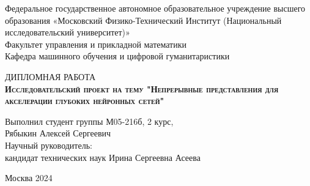 \begin{titlepage}
\newpage

{
\begin{center}
Федеральное государственное автономное образовательное учреждение высшего образования «Московский Физико-Технический Институт (Национальный исследовательский университет)»
\\
\bigskip
Факультет управления и прикладной математики \\
Кафедра машинного обучения и цифровой гуманитаристики \\
\end{center}
}

\vspace{8em}

\begin{center}
{\Large ДИПЛОМНАЯ РАБОТА}\\
\textsc{\textbf{
Исследовательский проект на тему
\linebreak
"Непрерывные представления для акселерации глубоких нейронных сетей"}}

\end{center}

\vspace{2em}

{
\hfill\parbox{16cm}{
\hspace*{5cm}\hspace*{-5cm}Выполнил студент группы М05-216б, 2 курс,\\
 Рябыкин Алексей Сергеевич\\
 
\hspace*{5cm}\hspace*{-5cm}Научный руководитель:\\
кандидат технических наук Ирина Сергеевна Асеева \\


}
}

\vspace{\fill}

\begin{center}
Москва 2024
\end{center}

\end{titlepage}